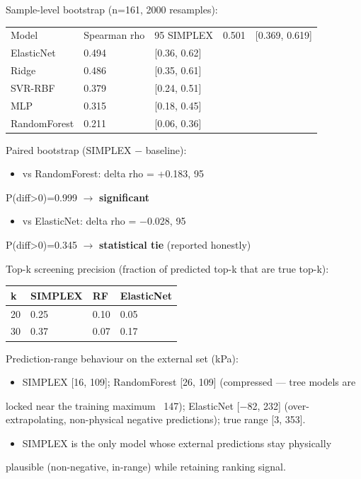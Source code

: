 \documentclass[utf8]{frontiers_suppmat}
\begin{document}
Sample-level bootstrap (n=161, 2000 resamples):

\begin{tabular}{lll}
\toprule
Model & Spearman rho & 95%
\midrule
SIMPLEX & 0.501 & [0.369, 0.619] \\
ElasticNet & 0.494 & [0.36, 0.62] \\
Ridge & 0.486 & [0.35, 0.61] \\
SVR-RBF & 0.379 & [0.24, 0.51] \\
MLP & 0.315 & [0.18, 0.45] \\
RandomForest & 0.211 & [0.06, 0.36] \\
\bottomrule
\end{tabular}


Paired bootstrap (SIMPLEX − baseline):
\begin{itemize}
\item vs RandomForest: delta rho = +0.183, 95%
\end{itemize}
  P(diff>0)=0.999 $\rightarrow$ \textbf{significant}
\begin{itemize}
\item vs ElasticNet: delta rho = −0.028, 95%
\end{itemize}
  P(diff>0)=0.345 $\rightarrow$ \textbf{statistical tie} (reported honestly)

Top-k screening precision (fraction of predicted top-k that are true top-k):

\begin{tabular}{llll}
\toprule
k & SIMPLEX & RF & ElasticNet \\
\midrule
20 & 0.25 & 0.10 & 0.05 \\
30 & 0.37 & 0.07 & 0.17 \\
\bottomrule
\end{tabular}


Prediction-range behaviour on the external set (kPa):
\begin{itemize}
\item SIMPLEX [16, 109]; RandomForest [26, 109] (compressed — tree models are
\end{itemize}
  locked near the training maximum ~147); ElasticNet [−82, 232] (over-extrapolating,
  non-physical negative predictions); true range [3, 353].
\begin{itemize}
\item SIMPLEX is the only model whose external predictions stay physically
\end{itemize}
  plausible (non-negative, in-range) while retaining ranking signal.
\end{document}
